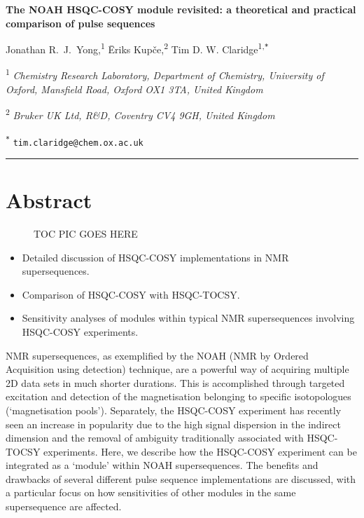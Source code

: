 \documentclass[a4paper,12pt]{article}
\newcommand{\me}{Jonathan R.\ J.\ Yong}
\newcommand{\eriks}{{\=E}riks Kup{\v{c}}e}
\newcommand{\tim}{Tim D. W. Claridge}
\newcommand{\articletitle}{\todo{The NOAH HSQC-COSY module revisited: a theoretical and practical comparison of pulse sequences}}
\newcommand{\crl}{Chemistry Research Laboratory, Department of Chemistry, University of Oxford, Mansfield Road, Oxford OX1 3TA, United Kingdom}
\newcommand{\turing}{The Alan Turing Institute, The British Library, 96 Euston Road, London NW1 2DB, United Kingdom}
\newcommand{\brukeruk}{Bruker UK Ltd, R\&D, Coventry CV4 9GH, United Kingdom}
\newcommand{\exscientia}{Exscientia Ltd, The Schr{\"o}dinger Building, Oxford Science Park, Oxford OX4 4GE, United Kingdom}
\newcommand{\proton}{\ch{^{1}H}}
\newcommand{\todo}[1]{{\color{OrangeRed}#1}}
\begin{document}
 \begin{refsection}

\begin{center}   %
    \textbf{\Large \articletitle{}}

    \vspace{0.2cm}

    \me{},\textsuperscript{1} \eriks{},\textsuperscript{2} \tim\textsuperscript{1,\texttt{*}}

    \vspace{0.2cm}

    \small

    \textsuperscript{1} \textit{\crl{}}


    \textsuperscript{2} \textit{\brukeruk{}}


    \normalsize \textsuperscript{\texttt{*}} \texttt{tim.claridge@chem.ox.ac.uk}

    \vspace{0.5cm} \hrule

\end{center}

\section*{Abstract}
\begin{figure}[ht]
    \todo{TOC PIC GOES HERE}
\end{figure}

\begin{itemize}
    \item Detailed discussion of HSQC-COSY implementations in NMR supersequences.
    \item Comparison of HSQC-COSY with HSQC-TOCSY.
    \item Sensitivity analyses of modules within typical NMR supersequences involving HSQC-COSY experiments.
\end{itemize}

NMR supersequences, as exemplified by the NOAH (NMR by Ordered Acquisition using \proton{} detection) technique, are a powerful way of acquiring multiple 2D data sets in much shorter durations.
This is accomplished through targeted excitation and detection of the magnetisation belonging to specific isotopologues (`magnetisation pools').
Separately, the HSQC-COSY experiment has recently seen an increase in popularity due to the high signal dispersion in the indirect dimension and the removal of ambiguity traditionally associated with HSQC-TOCSY experiments.
Here, we describe how the HSQC-COSY experiment can be integrated as a `module' within NOAH supersequences.
The benefits and drawbacks of several different pulse sequence implementations are discussed, with a particular focus on how sensitivities of other modules in the same supersequence are affected.


\end{refsection}
\end{document}
